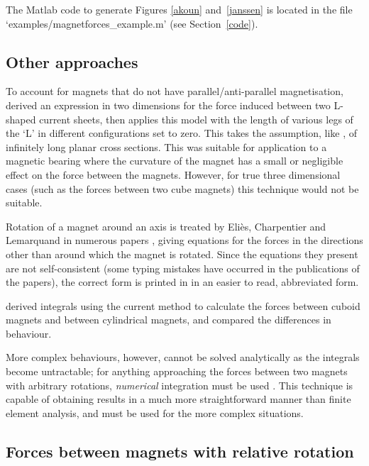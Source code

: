 The Matlab code to generate Figures \ref{akoun} and~\ref{janssen} is located in the file `examples/magnetforces\_example.m' (see Section~\ref{code}).


\subsection{Other approaches}

To account for magnets that do not have parallel/anti-parallel
magnetisation, \textcite{chen2002,chen2003} derived an expression in two
dimensions for the force induced between two L-shaped current
sheets, then applies this model with the length
of various legs of the `L' in different configurations set to zero. This
takes the assumption, like \textcite{yonnet1981}, of infinitely long
planar cross sections.
This was suitable for application to a magnetic bearing where
the curvature of the magnet has a small or negligible effect on the
force between the magnets. However, for true three dimensional cases
(such as the forces between two cube magnets) this technique would not
be suitable.

Rotation of a magnet around an axis is treated by Eliès, Charpentier and
Lemarquand in numerous papers
\cite{elies1998,charpentier1999-ietm-mar,charpentier1999-ietm-sep,elies1999a}, giving equations
for the forces in the directions other than around which the magnet is
rotated. Since the equations they present are not self-consistent (some typing
mistakes have occurred in the publications of the papers), the correct form is
printed in  in an easier to read, abbreviated form.

\textcite{nagaraj1988} derived integrals using the current method
 to calculate the forces between cuboid magnets and
between cylindrical magnets, and compared the differences in
behaviour.

More complex behaviours, however, cannot be solved analytically as the
integrals become untractable; for anything approaching the forces
between two magnets with arbitrary rotations, \emph{numerical}
integration must be used \cite{elies1999a}. This technique is capable
of obtaining results in a much more straightforward manner than finite
element analysis, and must be used for the more complex situations.

\subsection{Forces between magnets with relative rotation}

